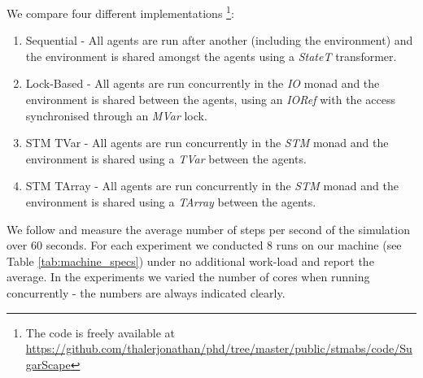 We compare four different implementations \footnote{The code is freely available at \url{https://github.com/thalerjonathan/phd/tree/master/public/stmabs/code/SugarScape}}:

\begin{enumerate}
	\item Sequential - All agents are run after another (including the environment) and the environment is shared amongst the agents using a \textit{StateT} transformer.
	\item Lock-Based - All agents are run concurrently in the \textit{IO} monad and the environment is shared between the agents, using an \textit{IORef} with the access synchronised through an \textit{MVar} lock.
	\item STM TVar - All agents are run concurrently in the \textit{STM} monad and the environment is shared using a \textit{TVar} between the agents.
	\item STM TArray - All agents are run concurrently in the \textit{STM} monad and the environment is shared using a \textit{TArray} between the agents. 
\end{enumerate}

We follow \cite{lysenko_framework_2008} and measure the average number of steps per second of the simulation over 60 seconds. For each experiment we conducted 8 runs on our machine (see Table \ref{tab:machine_specs}) under no additional work-load and report the average. In the experiments we varied the number of cores when running concurrently - the numbers are always indicated clearly.


